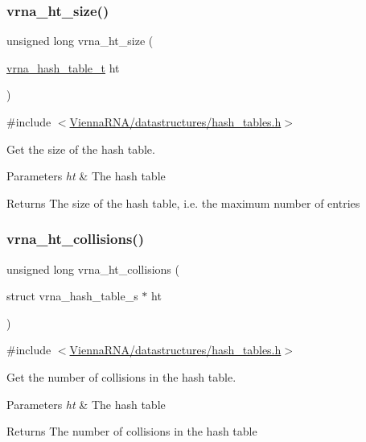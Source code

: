 \subsubsection{\texorpdfstring{vrna\_ht\_size()}{vrna\_ht\_size()}}
{\footnotesize\ttfamily unsigned long vrna\+\_\+ht\+\_\+size (\begin{DoxyParamCaption}\item[{\mbox{\hyperlink{group__hash__table__utils_gabc7c6f41b718c8e23929e528891a89c4}{vrna\+\_\+hash\+\_\+table\+\_\+t}}}]{ht }\end{DoxyParamCaption})}



{\ttfamily \#include $<$\mbox{\hyperlink{hash__tables_8h}{Vienna\+R\+N\+A/datastructures/hash\+\_\+tables.\+h}}$>$}



Get the size of the hash table. 


\begin{DoxyParams}{Parameters}
{\em ht} & The hash table \\
\hline
\end{DoxyParams}
\begin{DoxyReturn}{Returns}
The size of the hash table, i.\+e. the maximum number of entries 
\end{DoxyReturn}
\mbox{\label{group__hash__table__utils_ga928e7a27a9d34d254ce3855f1ab1d190}} 
\subsubsection{\texorpdfstring{vrna\_ht\_collisions()}{vrna\_ht\_collisions()}}
{\footnotesize\ttfamily unsigned long vrna\+\_\+ht\+\_\+collisions (\begin{DoxyParamCaption}\item[{struct vrna\+\_\+hash\+\_\+table\+\_\+s $\ast$}]{ht }\end{DoxyParamCaption})}



{\ttfamily \#include $<$\mbox{\hyperlink{hash__tables_8h}{Vienna\+R\+N\+A/datastructures/hash\+\_\+tables.\+h}}$>$}



Get the number of collisions in the hash table. 


\begin{DoxyParams}{Parameters}
{\em ht} & The hash table \\
\hline
\end{DoxyParams}
\begin{DoxyReturn}{Returns}
The number of collisions in the hash table 
\end{DoxyReturn}
\mbox{\label{group__hash__table__utils_ga38f124472c8e7e75f067d3b27b43da09}} 
